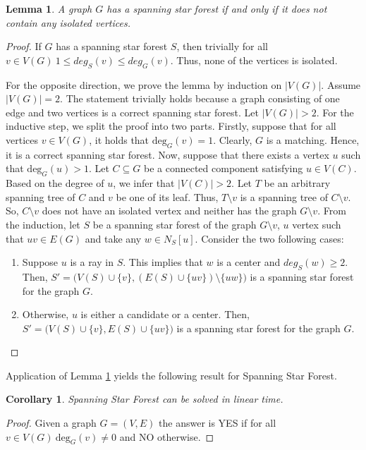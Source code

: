 \documentclass[en]{pracamgr}
\newtheorem{lemma}{Lemma}
\newtheorem{corollary}{Corollary}
\newcommand{\ssf}{spanning star forest}
\newcommand{\ssfp}{{\sc Spanning Star Forest}}
\newcommand{\degree}[2]{\textrm{deg}_{#1}(#2)}
\begin{document}
\begin{lemma}\label{SSF lemma}
 A graph $G$ has a \ssf{} if and only if it does not contain any isolated vertices.
\end{lemma}

\begin{proof}
	If $G$ has a \ssf{} $S$, then trivially for all $v \in V(G)\ 1 \leq deg_S(v) \leq deg_G(v)$. Thus, none of the vertices is isolated.
	
	For the opposite direction, we prove the lemma by induction on $|V(G)|$. Assume $|V(G)|=2$. The statement trivially holds because a graph consisting of one edge and two vertices is a correct \ssf{}. Let $|V(G)| >2$. For the inductive step, we split the proof into two parts. Firstly, suppose that for all vertices $v \in V(G)$, it holds that $\degree{G}{v}=1$.  Clearly, $G$ is a matching. Hence, it is a correct \ssf{}. Now, suppose that there exists a vertex $u$ such that $\degree{G}{u}>1$. Let $C \subseteq G$ be a connected component satisfying $u \in V(C)$. Based on the degree of $u$, we infer that $|V(C)|>2$. Let $T$ be an arbitrary spanning tree of $C$ and $v$ be one of its leaf. Thus, $T \setminus v$ is a spanning tree of $C \setminus v$. So, $C \setminus v$ does not have an isolated vertex and neither has the graph $G \setminus v$. From the induction, let $S$ be a \ssf{} of the graph $G \setminus v$, $u$ vertex such that $uv \in E(G)$ and take any $w \in N_S[u]$. Consider the two following cases:
	\begin{enumerate}
		\item Suppose $u$ is a ray in $S$. This implies that $w$ is a center and $deg_S(w) \geq 2$. Then, $S'=\big(V(S) \cup \{v\},(E(S) \cup \{uv\}) \setminus \{uw\}\big)$ is a spanning star forest for the graph $G$.
		\item Otherwise, $u$ is either a candidate or a center. Then, $S'=\big(V(S) \cup \{v\}, E(S) \cup \{uv\}\big)$ is a spanning star forest for the graph $G$.
	\end{enumerate}
	
\end{proof}

Application of Lemma \ref{SSF lemma} yields the following result for \ssfp{}.

\begin{corollary}
	\ssfp{} can be solved in linear time.
\end{corollary}

\begin{proof}
	Given a graph $G = (V,E)$ the answer is YES if for all $v \in V(G)\ \degree{G}{v} \neq 0$ and NO otherwise.
\end{proof}
\end{document}
